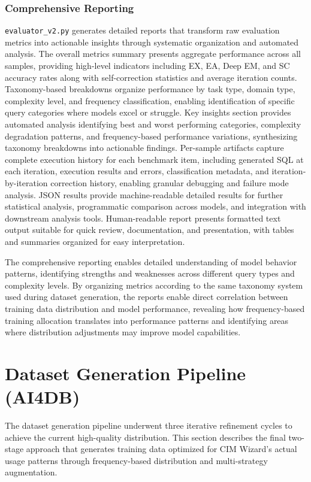 \subsubsection{Comprehensive Reporting}

\texttt{evaluator\_v2.py} generates detailed reports that transform raw evaluation metrics into actionable insights through systematic organization and automated analysis. The overall metrics summary presents aggregate performance across all samples, providing high-level indicators including EX, EA, Deep EM, and SC accuracy rates along with self-correction statistics and average iteration counts. Taxonomy-based breakdowns organize performance by task type, domain type, complexity level, and frequency classification, enabling identification of specific query categories where models excel or struggle. Key insights section provides automated analysis identifying best and worst performing categories, complexity degradation patterns, and frequency-based performance variations, synthesizing taxonomy breakdowns into actionable findings. Per-sample artifacts capture complete execution history for each benchmark item, including generated SQL at each iteration, execution results and errors, classification metadata, and iteration-by-iteration correction history, enabling granular debugging and failure mode analysis. JSON results provide machine-readable detailed results for further statistical analysis, programmatic comparison across models, and integration with downstream analysis tools. Human-readable report presents formatted text output suitable for quick review, documentation, and presentation, with tables and summaries organized for easy interpretation.

The comprehensive reporting enables detailed understanding of model behavior patterns, identifying strengths and weaknesses across different query types and complexity levels. By organizing metrics according to the same taxonomy system used during dataset generation, the reports enable direct correlation between training data distribution and model performance, revealing how frequency-based training allocation translates into performance patterns and identifying areas where distribution adjustments may improve model capabilities.

\section{Dataset Generation Pipeline (AI4DB)}

The dataset generation pipeline underwent three iterative refinement cycles to achieve the current high-quality distribution. This section describes the final two-stage approach that generates training data optimized for CIM Wizard's actual usage patterns through frequency-based distribution and multi-strategy augmentation.

